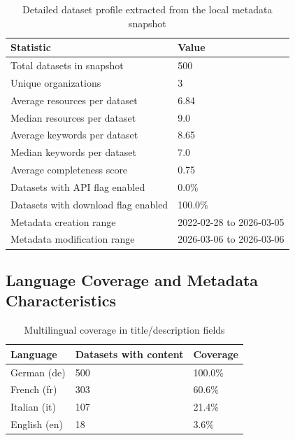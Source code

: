 \documentclass[11pt,a4paper]{article}
\begin{document}
\begin{table}[H]
\centering
\begin{tabular}{p{} p{}}
\toprule
\textbf{Statistic} & \textbf{Value} \\
\midrule
Total datasets in snapshot & 500 \\
Unique organizations & 3 \\
Average resources per dataset & 6.84 \\
Median resources per dataset & 9.0 \\
Average keywords per dataset & 8.65 \\
Median keywords per dataset & 7.0 \\
Average completeness score & 0.75 \\
Datasets with API flag enabled & 0.0\% \\
Datasets with download flag enabled & 100.0\% \\
Metadata creation range & 2022-02-28 to 2026-03-05 \\
Metadata modification range & 2026-03-06 to 2026-03-06 \\
\bottomrule
\end{tabular}
\caption{Detailed dataset profile extracted from the local metadata snapshot}
\end{table}

\subsection{Language Coverage and Metadata Characteristics}

\begin{table}[H]
\centering
\begin{tabular}{p{} p{} p{}}
\toprule
\textbf{Language} & \textbf{Datasets with content} & \textbf{Coverage} \\
\midrule
German (de) & 500 & 100.0\% \\
French (fr) & 303 & 60.6\% \\
Italian (it) & 107 & 21.4\% \\
English (en) & 18 & 3.6\% \\
\bottomrule
\end{tabular}
\caption{Multilingual coverage in title/description fields}
\end{table}
\end{document}
